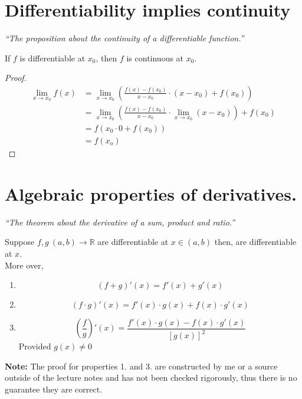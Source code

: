 \documentclass[12pt]{report}
\begin{document}
    \setcounter{section}{6}
    \section{Differentiability implies continuity}
    \textit{``The proposition about the continuity of a differentiable function.''} \vspace{3mm}
    \begin{theorem}
        If \(f\) is differentiable at \(x_0\), then \(f\) is continuous at \(x_0\).
    \end{theorem}
    \begin{proof}
        \begin{align*}
            \lim_{x \to x_0} f(x) &= \lim_{x \to x_0} \left(\frac{f(x) - f(x_0)}{x-x_0}\cdot (x-x_0) + f(x_0)\right)\\
            &= \lim_{x \to x_0} \left(\frac{f(x) - f(x_0)}{x-x_0} \cdot \lim_{x \to x_0} (x-x_0)\right) + f(x_0)\\
            &= f(x_0 \cdot 0 +f(x_0))\\
            &= f(x_o)
        \end{align*}
    \end{proof}

    \newpage
    \section{Algebraic properties of derivatives.}
    \textit{``The theorem about the derivative of a sum, product and ratio.''} \vspace{3mm}
    \begin{theorem}
        Suppose \(f,g ~ (a,b) \to \mathbb{R}\) are differentiable at \(x \in (a,b)\) then,
        \sidebysidebyside{\[f+g\]}{\[f\cdot g\]}{\[\frac{f}{g}\]}
        are differentiable at \(x\).
        \\
        More over,
        \begin{enumerate}
            \item \[\hyperref[Addition of derivatives]{\left(f + g\right)' (x) = f'(x) + g'(x)}\]
            \item \[\hyperref[Multiplication of derivatives]{\left(f \cdot g\right)'(x) = f'(x) \cdot g(x) + f(x) \cdot g'(x)}\]
            \item \[\hyperref[Division of derivatives]{\left(\frac{f}{g}\right)'(x) = \frac{f'(x) \cdot g(x) - f(x) \cdot g'(x)}{[g(x)]^2}}\]
            Provided \(g(x) \not =0\)
        \end{enumerate}
    \end{theorem}
    \textbf{Note:} The proof for properties 1. and 3. are constructed by me or a source outside of the lecture notes and has not been checked rigorously, thus there is no guarantee they are correct.
\end{document}
